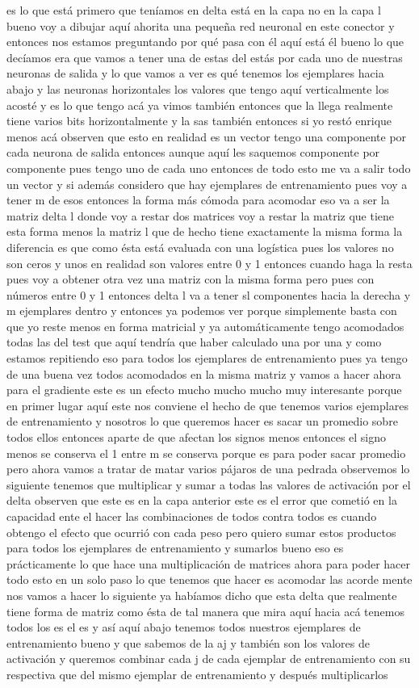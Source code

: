 es lo que está primero que teníamos en delta está en la capa no en la capa l bueno voy a dibujar aquí ahorita una pequeña red neuronal en este conector y entonces nos estamos preguntando por qué pasa con él aquí está él bueno lo que decíamos era que vamos a tener una de estas del estás por cada uno de nuestras neuronas de salida y lo que vamos a ver es qué tenemos los ejemplares hacia abajo y las neuronas horizontales los valores que tengo aquí verticalmente los acosté y es lo que tengo acá ya vimos también entonces que la llega realmente tiene varios bits horizontalmente y la sas también entonces si yo restó enrique menos acá observen que esto en realidad es un vector tengo una componente por cada neurona de salida entonces aunque aquí les saquemos componente por componente pues tengo uno de cada uno entonces de todo esto me va a salir todo un vector y si además considero que hay ejemplares de entrenamiento pues voy a tener m de esos entonces la forma más cómoda para acomodar eso va a ser la matriz delta l donde voy a restar dos matrices voy a restar la matriz que tiene esta forma menos la matriz l que de hecho tiene exactamente la misma forma la diferencia es que como ésta está evaluada con una logística pues los valores no son ceros y unos en realidad son valores entre 0 y 1 entonces cuando haga la resta pues voy a obtener otra vez una matriz con la misma forma pero pues con números entre 0 y 1 entonces delta l va a tener sl componentes hacia la derecha y m ejemplares dentro y entonces ya podemos ver porque simplemente basta con que yo reste menos en forma matricial y ya automáticamente tengo acomodados todas las del test que aquí tendría que haber calculado una por una y como estamos repitiendo eso para todos los ejemplares de entrenamiento pues ya tengo de una buena vez todos acomodados en la misma matriz y vamos a hacer ahora para el gradiente este es un efecto mucho mucho mucho muy interesante porque en primer lugar aquí este nos conviene el hecho de que tenemos varios ejemplares de entrenamiento y nosotros lo que queremos hacer es sacar un promedio sobre todos ellos entonces aparte de que afectan los signos menos entonces el signo menos se conserva el 1 entre m se conserva porque es para poder sacar promedio pero ahora vamos a tratar de matar varios pájaros de una pedrada observemos lo siguiente tenemos que multiplicar y sumar a todas las valores de activación por el delta observen que este es en la capa anterior este es el error que cometió en la capacidad ente el hacer las combinaciones de todos contra todos es cuando obtengo el efecto que ocurrió con cada peso pero quiero sumar estos productos para todos los ejemplares de entrenamiento y sumarlos bueno eso es prácticamente lo que hace una multiplicación de matrices ahora para poder hacer todo esto en un solo paso lo que tenemos que hacer es acomodar las acorde mente nos vamos a hacer lo siguiente ya habíamos dicho que esta delta que realmente tiene forma de matriz como ésta de tal manera que mira aquí hacia acá tenemos todos los es el es y así aquí abajo tenemos todos nuestros ejemplares de entrenamiento bueno y que sabemos de la aj y también son los valores de activación y queremos combinar cada j de cada ejemplar de entrenamiento con su respectiva que del mismo ejemplar de entrenamiento y después multiplicarlos 
